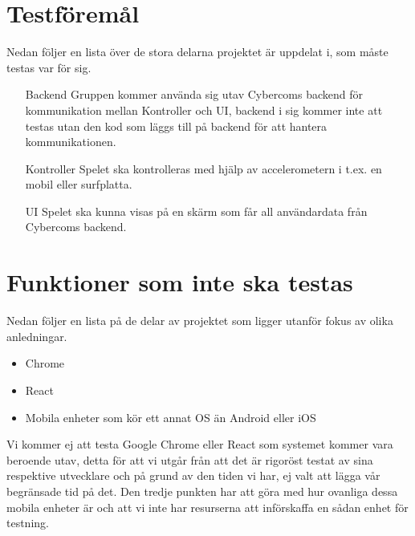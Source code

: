 \documentclass[10pt]{article}
\begin{document}
  
	


	
\section{Testföremål}
	Nedan följer en lista över de stora delarna projektet är uppdelat i, som måste testas var för sig.
	\begin{itemize}
	\item [Backend] Gruppen kommer använda sig utav Cybercoms backend för kommunikation mellan Kontroller och UI, backend i sig kommer inte att testas utan den kod som läggs till på backend för att hantera kommunikationen.
	\item [Kontroller] Spelet ska kontrolleras med hjälp av accelerometern i t.ex. en mobil eller surfplatta.
	\item [UI] Spelet ska kunna visas på en skärm som får all användardata från Cybercoms backend.
	\end{itemize}
	
	
\section{Funktioner som inte ska testas}
	Nedan följer en lista på de delar av projektet som ligger utanför fokus av olika anledningar.
	\begin{itemize}
	\item Chrome
	\item React
	\item Mobila enheter som kör ett annat OS än Android eller iOS
	\end{itemize}
	Vi kommer ej att testa Google Chrome eller React som systemet kommer vara beroende utav, detta för att vi utgår från att det är rigoröst testat av sina respektive utvecklare och på grund av den tiden vi har, ej valt att lägga vår begränsade tid på det. Den tredje punkten har att göra med hur ovanliga dessa mobila enheter är och att vi inte har resurserna att införskaffa en sådan enhet för testning. 
\end{document}
